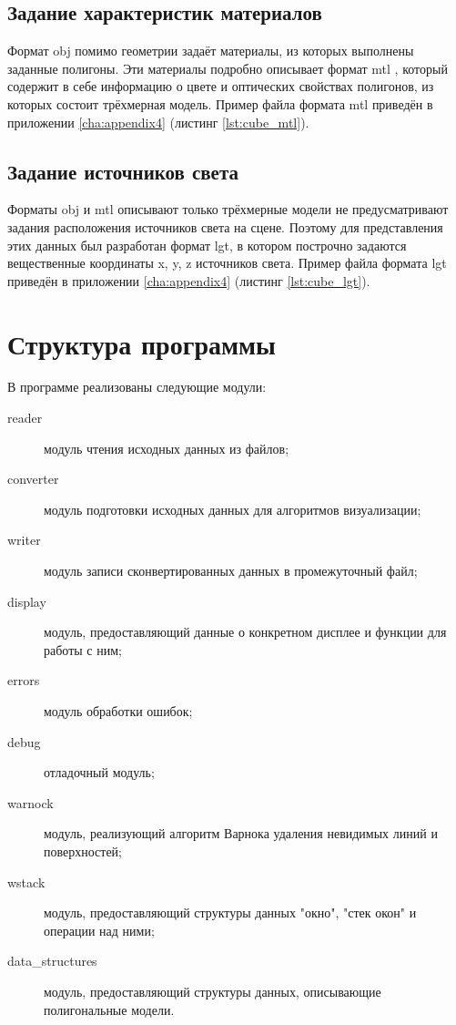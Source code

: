 \subsection{Задание характеристик материалов}
Формат obj помимо геометрии задаёт материалы, из которых выполнены заданные полигоны. Эти материалы подробно описывает формат 
mtl \cite{mtl}, который содержит в себе информацию о цвете и оптических свойствах полигонов, из которых состоит трёхмерная модель. 
Пример файла формата mtl приведён в приложении \ref{cha:appendix4} (листинг \ref{lst:cube_mtl}).

\subsection{Задание источников света}
Форматы obj и mtl описывают только трёхмерные модели не предусматривают задания расположения источников света на сцене. Поэтому 
для представления этих данных был разработан формат lgt, в котором построчно задаются вещественные координаты x, y, z источников света. 
Пример файла формата lgt приведён в приложении \ref{cha:appendix4} (листинг \ref{lst:cube_lgt}).



\section{Структура программы}
В программе реализованы следующие модули:
\begin{description}
	\item[reader] модуль чтения исходных данных из файлов;
	\item[converter] модуль подготовки исходных данных для алгоритмов визуализации;
	\item[writer] модуль записи сконвертированных данных в промежуточный файл;
	\item[display] модуль, предоставляющий данные о конкретном дисплее и функции для работы с ним;
	\item[errors] модуль обработки ошибок;
	\item[debug] отладочный модуль;
	\item[warnock] модуль, реализующий алгоритм Варнока удаления невидимых линий и поверхностей;
	\item[wstack] модуль, предоставляющий структуры данных "окно"{}, "стек окон"{} и операции над ними;
	\item[data\_structures] модуль, предоставляющий структуры данных, описывающие полигональные модели.
\end{description}

